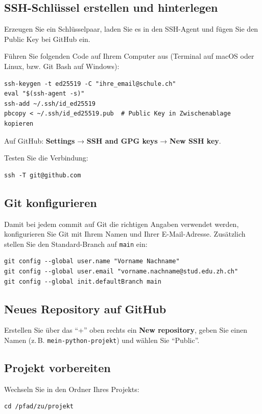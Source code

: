 \subsection*{SSH-Schlüssel erstellen und hinterlegen}
Erzeugen Sie ein Schlüsselpaar, laden Sie es in den SSH-Agent und fügen Sie den Public Key bei GitHub ein.

Führen Sie folgenden Code auf Ihrem Computer aus (Terminal auf macOS oder Linux, bzw. Git Bash auf Windows):
\begin{lstlisting}[style=bash]
ssh-keygen -t ed25519 -C "ihre_email@schule.ch"
eval "$(ssh-agent -s)"
ssh-add ~/.ssh/id_ed25519
pbcopy < ~/.ssh/id_ed25519.pub  # Public Key in Zwischenablage kopieren
\end{lstlisting}


Auf GitHub: \textbf{Settings} → \textbf{SSH and GPG keys} → \textbf{New SSH key}.  

Testen Sie die Verbindung:  
\begin{lstlisting}[style=bash]
ssh -T git@github.com
\end{lstlisting}

\subsection*{Git konfigurieren}
Damit bei jedem commit auf Git die richtigen Angaben verwendet werden, konfigurieren Sie Git mit Ihrem Namen und Ihrer E-Mail-Adresse. Zusätzlich stellen Sie den Standard-Branch auf \lstinline|main| ein:

\begin{lstlisting}[style=bash]
git config --global user.name "Vorname Nachname"
git config --global user.email "vorname.nachname@stud.edu.zh.ch"
git config --global init.defaultBranch main
\end{lstlisting}

\subsection*{Neues Repository auf GitHub}
Erstellen Sie über das \enquote{+'' oben rechts ein \textbf{New repository}, geben Sie einen Namen (z.\,B. \lstinline|mein-python-projekt|) und wählen Sie ``Public}.



\subsection*{Projekt vorbereiten}
Wechseln Sie in den Ordner Ihres Projekts:  
\begin{lstlisting}[style=bash]
cd /pfad/zu/projekt
\end{lstlisting}

